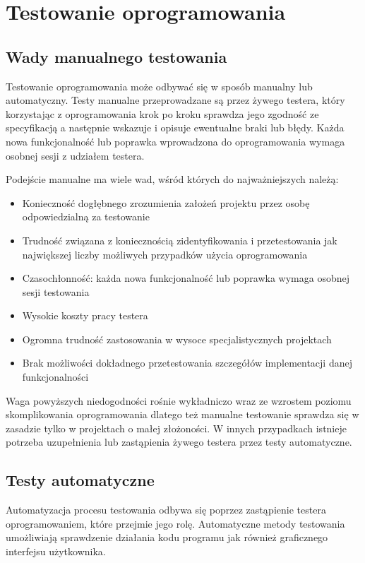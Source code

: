 	\section{Testowanie oprogramowania}
	  \subsection{Wady manualnego testowania}
  	  Testowanie oprogramowania może odbywać się w sposób manualny lub automatyczny. Testy manualne przeprowadzane są przez żywego testera, który korzystając z oprogramowania krok po kroku sprawdza jego zgodność ze specyfikacją a następnie wskazuje i opisuje ewentualne braki lub błędy. Każda nowa funkcjonalność lub poprawka wprowadzona do oprogramowania wymaga osobnej sesji z udziałem testera. 
	  
  	  Podejście manualne ma wiele wad, wśród których do najważniejszych należą:
	  
  	  \begin{itemize}
  	    \item Konieczność dogłębnego zrozumienia założeń projektu przez osobę odpowiedzialną za testowanie
  	    \item Trudność związana z koniecznością zidentyfikowania i przetestowania jak największej liczby możliwych przypadków użycia oprogramowania
  	    \item Czasochłonność: każda nowa funkcjonalność lub poprawka wymaga osobnej sesji testowania
  	   	\item Wysokie koszty pracy testera
  	   	\item Ogromna trudność zastosowania w wysoce specjalistycznych projektach
  	   	\item Brak możliwości dokładnego przetestowania szczegółów implementacji danej funkcjonalności
  	  \end{itemize}
	  
  	  Waga powyższych niedogodności rośnie wykładniczo wraz ze wzrostem poziomu skomplikowania oprogramowania dlatego też manualne testowanie sprawdza się w zasadzie tylko w projektach o małej złożoności. W innych przypadkach istnieje potrzeba uzupełnienia lub zastąpienia żywego testera przez testy automatyczne.
	  
	  \subsection{Testy automatyczne}
	    Automatyzacja procesu testowania odbywa się poprzez zastąpienie testera oprogramowaniem, które przejmie jego rolę. Automatyczne metody testowania umożliwiają sprawdzenie działania kodu programu jak również graficznego interfejsu użytkownika.
